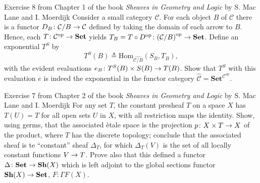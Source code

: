 \documentclass[a4paper]{article}
\begin{document}
\begin{snippetexercise}{Exercise 8 from Chapter 1 of the book \emph{Sheaves in Geometry and Logic} by S. Mac Lane and I. Moerdijk}
    Consider a small category \(\mathcal C\). For each object \(B\)
    of \(\mathcal C\) there is a functor \(D_B \colon \mathcal C/B \to \mathcal C\) defined by taking the domain
    of each arrow to \(B\). Hence, each \(T \colon \mathcal C^{\text{op}} \to \mathbf{Set}\) yields
    \(T_B = T \circ D^{\text{op}} \colon {(\mathcal C/B)}^{\text{op}} \to \mathbf{Set}\).
    Define an exponential \(T^S\) by
    \[
        T^S(B) \triangleq \text{Hom}_{\widehat{\mathcal C/B}}(S_B, T_B),
    \]
    with the evident evaluations \(e_B \colon T^S(B) \times S(B) \to T(B)\).
    Show that \(T^S\) with this evaluation \(e\) is indeed the exponential in the functor
    category \(\widehat{\mathcal C} = {\mathbf{Set}}^{\mathcal C^{\text{op}}}\).
\end{snippetexercise}

\begin{snippetexercise}{Exercise 7 from Chapter 2 of the book \emph{Sheaves in Geometry and Logic} by S. Mac Lane and I. Moerdijk}
    For any set \(T\), the constant presheaf \(T\) on a space \(X\) has
    \(T(U) = T\) for all open sets \(U\) in \(X\), with all restriction maps the identity.
    Show, using germs, that the associated ètale space is the projection \(p \colon X \times T \to X\) of the
    product, where \(T\) has the discrete topology; conclude that the associated sheaf is te ``constant''
    sheaf \(\Delta_T\), for which \(\Delta_T(V)\) is the set of all locally constant functions
    \(V \to T\). Prove also that this defined a functor \(\Delta \colon \mathbf{Set} \to \mathbf{Sh}(X)\)
    which is left adjoint to the global sections functor \(\mathbf{Sh}(X) \to \mathbf{Set}\),
    \(F \colon \Gamma F(X)\).
\end{snippetexercise}
\end{document}

